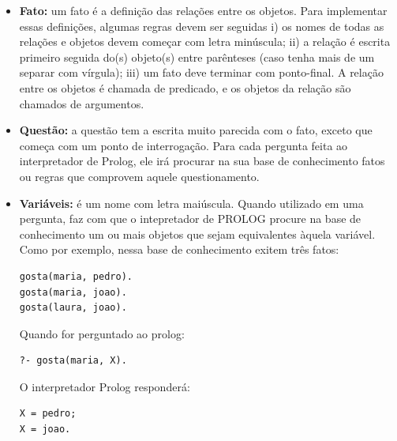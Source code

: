 \begin{itemize}
\item \textbf{Fato:} um fato é a definição das relações entre os objetos. Para implementar essas definições, algumas regras devem ser seguidas i) os nomes de todas as relações e objetos devem começar com letra minúscula; ii) a relação é escrita primeiro seguida do(s) objeto(s) entre parênteses (caso tenha mais de um separar com vírgula); iii) um fato deve terminar com ponto-final. A relação entre os objetos é chamada de predicado, e os objetos da relação são chamados de argumentos.
\item \textbf{Questão:} a questão tem a escrita muito parecida com o fato, exceto que começa com um ponto de interrogação. Para cada pergunta feita ao interpretador de Prolog, ele irá procurar na sua base de conhecimento fatos ou regras que comprovem aquele questionamento. 
\item \textbf{Variáveis:} é um nome com letra maiúscula. Quando utilizado em uma pergunta, faz com que o intepretador de PROLOG procure na base de conhecimento um ou mais objetos que sejam equivalentes àquela variável. Como por exemplo, nessa base de conhecimento exitem três fatos: 

\lstset{language=Prolog}
\begin{lstlisting}
gosta(maria, pedro).
gosta(maria, joao). 
gosta(laura, joao).
\end{lstlisting}

Quando for perguntado ao prolog:
\lstset{language=Prolog}
\begin{lstlisting}
?- gosta(maria, X).
\end{lstlisting}

O interpretador Prolog responderá:
\lstset{language=Prolog}
\begin{lstlisting}
X = pedro;
X = joao.
\end{lstlisting}


\end{itemize}
